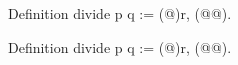   Definition divide p q := (@\ltacexists@)r, (@@).

  Definition divide p q := (@\ltacexists@)r, (@@).
